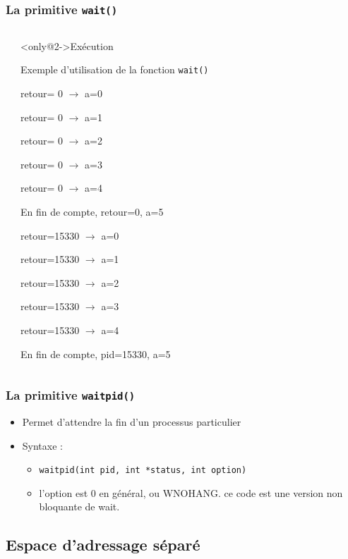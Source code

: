 \begin{frame}
\frametitle{La primitive \texttt{wait()}}
\begin{columns}
\begin{small}

\end{small}
\begin{block}<only@2->{Exécution}
\begin{tiny}
Exemple d'utilisation de la fonction \texttt{wait()}

retour=    0 $\rightarrow$ a=0

retour=    0 $\rightarrow$ a=1

retour=    0 $\rightarrow$ a=2

retour=    0 $\rightarrow$ a=3

retour=    0 $\rightarrow$ a=4

En fin de compte, retour=0, a=5

retour=15330 $\rightarrow$ a=0

retour=15330 $\rightarrow$ a=1

retour=15330 $\rightarrow$ a=2

retour=15330 $\rightarrow$ a=3

retour=15330 $\rightarrow$ a=4

En fin de compte, pid=15330, a=5
\end{tiny}
\end{block}
\end{columns}
\end{frame}

\begin{frame}
\frametitle{La primitive \texttt{waitpid()}}
\begin{itemize}
\item Permet d'attendre la fin d'un processus particulier
\item Syntaxe :
\begin{itemize}
\item \texttt{waitpid(int pid, int *status, int option)}
\item l'option est 0 en général, ou WNOHANG. ce code est une version non bloquante de wait.
\end{itemize}
\end{itemize}
\end{frame}



\subsection{Espace d’adressage séparé}

